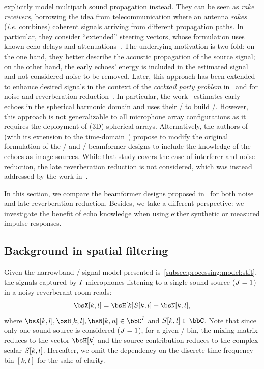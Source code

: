  explicitly model multipath sound propagation instead.
They can be seen as \textit{rake receivers}, borrowing the idea from telecommunication where an antenna \textit{rakes} (\textit{i.e.} combines) coherent signals arriving from different propagation paths.
In particular, they consider ``extended'' steering vectors, whose formulation uses known echo delays and attenuations~.
The underlying motivation is two-fold:
on the one hand, they better describe the acoustic propagation of the source signal; on the other hand, the early echoes' energy is included in the estimated signal and not considered noise to be removed.
Later, this approach has been extended to enhance desired signals in the context of the \textit{cocktail party problem} in~ and for noise and reverberation reduction~.
In particular, the work~ estimates early echoes in the spherical harmonic domain and uses their \DOAs/ to build \ReIR/.
However, this approach is not generalizable to all microphone array configurations as it requires the deployment of (3D) spherical arrays.
Alternatively, the authors of~ (with its extension to the time-domain~) propose to modify the original formulation of the \DStxt/ and \MVDRtxt/ beamformer designs to include the knowledge of the echoes as image sources.
While that study covers the case of interferer and noise reduction, the late reverberation reduction is not considered, which was instead addressed by the work in~.

\mynewline
In this section, we compare the beamformer designs proposed in~ for both noise and late reverberation reduction.
Besides, we take a different perspective: we investigate the benefit of echo knowledge when using either synthetic or measured impulse responses.

\subsection{Background in spatial filtering}
Given the narrowband \STFT/ signal model presented is~\cref{subsec:processing:model:stft}, the signals captured by $I$ microphones listening to a single sound source ($J=1$) in a noisy reverberant room reads:
\begin{equation}
    \MICS[k,l] = \FLTS[k] \SRC[k, l]+ \NSES[k,l]
    ,
\end{equation}
where $\MICS[k,l], \FLTS[k,l], \NSES[k,n] \in \bbC^{\numMics}$ and $\SRC[k,l] \in \bbC$.
Note that since only one sound source is considered ($J=1$), for a given \TF/ bin, the mixing matrix reduces to the vector $\FLTS[k]$ and the source contribution reduces to the complex scalar $S[k,l]$.
Hereafter, we omit the dependency on the discrete time-frequency bin $[k,l]$ for the sake of clarity.

